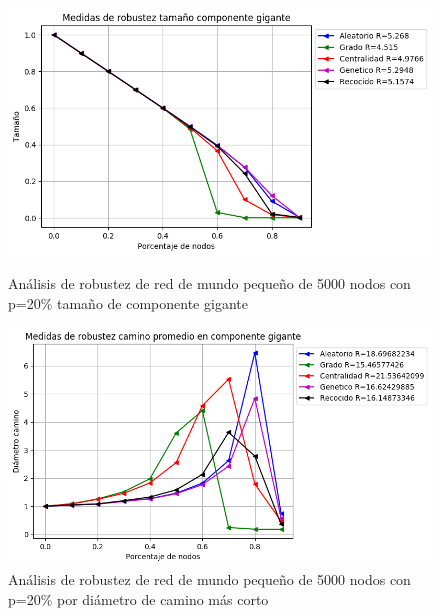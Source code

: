 \begin{figure}[!htb]
    \begin{minipage}{0.48\textwidth}
        \centering
        \includegraphics[scale=0.4]{CapituloAAnexos/imagenesAnexoC/Robustez/grafica_GC20180509_105905SmallWorld5000NodesRewire02}
        \caption{Análisis de robustez de red de mundo pequeño de 5000 nodos con p=20\% tamaño de componente gigante}
    \end{minipage}\hfill
   \begin{minipage}{0.48\textwidth}
         \centering
       \includegraphics[scale=0.4]{CapituloAAnexos/imagenesAnexoC/Robustez/grafica_APL20180509_105905SmallWorld5000NodesRewire02}
        \caption{Análisis de robustez de red de mundo pequeño de 5000 nodos con p=20\% por diámetro de camino más corto}
    \end{minipage}
\end{figure}



